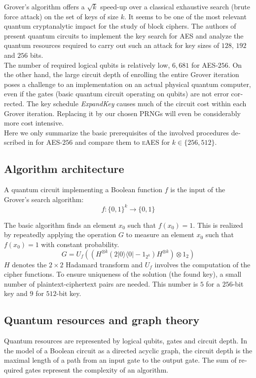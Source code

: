 \documentclass[a4paper,11pt]{article}
\begin{document}
\begin{otherlanguage}{english}
\noindent
Grover’s algorithm offers a $\sqrt{k}$ speed-up \cite{GRV} over a classical exhaustive search (brute force attack) on the set of keys of size $k$. It seems to be one of the most relevant quantum cryptanalytic impact for the study of block ciphers. The authors of \cite{GRO} present quantum circuits to implement the key search for \textsc{AES} and analyze the quantum resources required to carry out such an attack for key sizes of $128$, $192$ and $256$ bits. \\

\noindent
The number of required logical qubits is relatively low, $6,681$ for \textsc{AES}-$256$. On the other hand, the large circuit depth of enrolling the entire Grover iteration poses a challenge to an implementation on an actual physical quantum computer, even if the gates (basic quantum circuit operating on qubits) are not error corrected. The key schedule \textit{ExpandKey} causes much of the circuit cost within each Grover iteration. Replacing it by our chosen PRNGs will even be considerably more cost intensive. \\

\noindent
Here we only summarize the basic prerequisites of the involved procedures described in \cite{GRO} for \textsc{AES}-$256$ and compare them to \textsc{eAES} for $k \in \{256, 512\}$.

\subsection{Algorithm architecture}
\noindent
A quantum circuit implementing a Boolean function $f$ is the input of the Grover's search algorithm:
$$f: \{ 0,1 \}^k \rightarrow \{ 0,1 \} $$

\noindent
The basic algorithm finds an element $x_0$ such that $f(x_0)=1$. This is realized by repeatedly applying the operation $G$ to measure an element $x_0$ such that $f(x_0)=1$ with constant probability.
$$ G =U_f \left((H^{\otimes k} (2 |0\rangle \langle 0| -1_{2^k})H^{\otimes k})\otimes 1_2 \right)$$
$H$ denotes the $2 \times 2$ Hadamard transform and $U_f$ involves the computation of the cipher functions. To ensure uniqueness of the solution (the found key), a small number of plaintext-ciphertext pairs are needed. This number is $5$ for a $256$-bit key and $9$ for $512$-bit key.

\subsection{Quantum resources and graph theory}
\noindent
Quantum resources are represented by logical qubits, gates and circuit depth. In the model of a Boolean circuit as a directed acyclic graph, the circuit depth is the maximal length of a path from an input gate to the output gate. The sum of required gates represent the complexity of an algorithm.\\


\end{otherlanguage}
\end{document}
